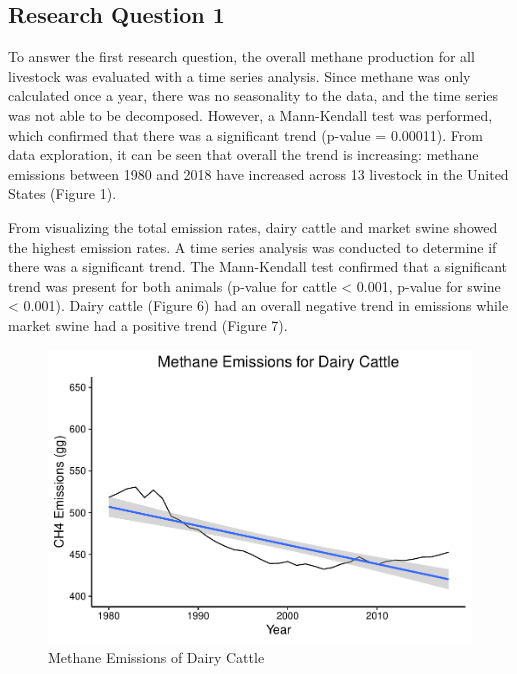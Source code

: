 \documentclass[
  12pt,
]{article}
\begin{document}
\hypertarget{research-question-1}{%
\subsection{Research Question 1}\label{research-question-1}}

To answer the first research question, the overall methane production
for all livestock was evaluated with a time series analysis. Since
methane was only calculated once a year, there was no seasonality to the
data, and the time series was not able to be decomposed. However, a
Mann-Kendall test was performed, which confirmed that there was a
significant trend (p-value = 0.00011). From data exploration, it can be
seen that overall the trend is increasing: methane emissions between
1980 and 2018 have increased across 13 livestock in the United States
(Figure 1).

From visualizing the total emission rates, dairy cattle and market swine
showed the highest emission rates. A time series analysis was conducted
to determine if there was a significant trend. The Mann-Kendall test
confirmed that a significant trend was present for both animals (p-value
for cattle \textless{} 0.001, p-value for swine \textless{} 0.001).
Dairy cattle (Figure 6) had an overall negative trend in emissions while
market swine had a positive trend (Figure 7).

\begin{figure}
\centering
\includegraphics{SultzerSwit_ENV872_Project_files/figure-latex/dairy.cattle.ts-1.pdf}
\caption{Methane Emissions of Dairy Cattle}
\end{figure}
\end{document}
